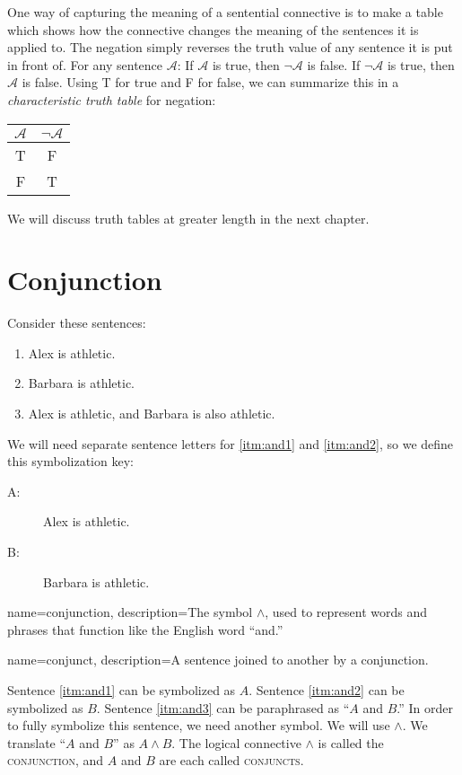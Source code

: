 One way of capturing the meaning of a sentential connective is to make a table which shows how the connective changes the meaning of the sentences it is applied to. The negation simply reverses the truth value of any sentence it is put in front of. For any sentence $\mathcal{A}$: If $\mathcal{A}$ is true, then $\lnot\mathcal{A}$ is false. If $\lnot\mathcal{A}$ is true, then $\mathcal{A}$ is false. Using T for true and F for false, we can summarize this in a \emph{characteristic truth table} for negation:

\begin{table}
\begin{tabular}{c|c}
$\mathcal{A}$ & $\lnot\mathcal{A}$\\
\hline
T & F\\
F & T
\end{tabular}
\end{table}

We will discuss truth tables at greater length in the next chapter.


\section{Conjunction}
Consider these sentences:
\begin{enumerate}
\item Alex is athletic. \label{itm:and1}
\item Barbara is athletic. \label{itm:and2}
\item Alex is athletic, and Barbara is also athletic. \label{itm:and3}
\end{enumerate}

We will need separate sentence letters for \ref{itm:and1} and \ref{itm:and2}, so we define this symbolization key:

\begin{description}
\item[A:] Alex is athletic.
\item[B:] Barbara is athletic.
\end{description}

{
name=conjunction,
description={The symbol \(\land\), used to represent words and phrases that function like the English word ``and.''}
}

{
name=conjunct,
description={A sentence joined to another by a conjunction.}
}

Sentence \ref{itm:and1} can be symbolized as $A$. Sentence \ref{itm:and2} can be symbolized as $B$. Sentence \ref{itm:and3} can be paraphrased as ``$A$ and $B$.'' In order to fully symbolize this sentence, we need another symbol.
We will use $\land$. We translate ``$A$ and $B$'' as $A\land B$. The logical connective $\land$ is called the \textsc{\gls{conjunction}}, \label{def:conjunction} and $A$ and $B$ are each called \textsc{\glspl{conjunct}}. \label{def:conjunct}

